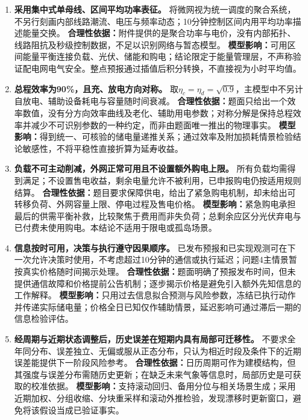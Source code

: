 \documentclass[withoutpreface,bwprint]{cumcmthesis}
\begin{document}
\begin{enumerate}[label=\textbf{假设\arabic*：},leftmargin=4.8em,itemsep=9pt,topsep=5pt]
\item \textbf{采用集中式单母线、区间平均功率表征。}
将微网视为统一调度的聚合系统，不另行刻画内部线路潮流、电压与频率动态；10分钟控制区间内用平均功率描述能量交换。
\textbf{合理性依据：}附件提供的是聚合功率与电价，没有内部拓扑、线路阻抗及秒级控制数据，不足以识别网络与暂态模型。
\textbf{模型影响：}可用区间能量平衡连接负载、光伏、储能和购电；结论限定于能量管理层，不声称验证配电网电气安全。整点预报通过插值后积分转换，不直接视为小时平均值。

\item \textbf{总程效率为90\%，且充、放电方向对称。}
取$\eta_c=\eta_d=\sqrt{0.9}$，主模型中不另计自放电、辅助设备耗电与容量随时间衰减。
\textbf{合理性依据：}题面只给出一个效率数值，没有分方向效率曲线及老化、辅助用电参数；对称分解是保持总程效率并减少不可识别参数的一种约定，而非由题面唯一推出的物理事实。
\textbf{模型影响：}得到统一、可核验的储电量递推关系；通过效率及附加损耗情景检验结论敏感性，不将平稳性直接折算为延寿收益。

\item \textbf{负载不可主动削减，外网正常可用且不设置额外购电上限。}
所有负载均需得到满足；不设置售电收益，剩余电量允许不被利用，已申报购电仍按适用规则结算。
\textbf{合理性依据：}题目要求保障供电，给出了紧急购电机制，却未给出可转移负荷、外网容量上限、停电过程及售电价格。
\textbf{模型影响：}紧急购电承担最后的供需平衡补救，比较聚焦于费用而非失负荷；总剩余应区分光伏弃电与已付费未使用购电。本结论不适用于限电或孤岛场景。

\item \textbf{信息按时可用，决策与执行遵守因果顺序。}
已发布预报和已实现观测可在下一次允许决策时使用，不考虑超过10分钟的通信或执行延迟；问题4主情景暂按真实价格随时间揭示处理。
\textbf{合理性依据：}题面明确了预报发布时间，但未提供通信故障和价格提前公告机制；逐步揭示价格是避免引入额外先知信息的工作解释。
\textbf{模型影响：}只用过去信息拟合预测与风险参数，冻结已执行动作并传递实际储电量；价格全日已知仅作辅助情景，延迟影响可通过滞后一期的信息检验评估。

\item \textbf{经周期与近期状态调整后，历史误差在短期内具有局部可迁移性。}
不要求全年同分布、误差独立、无偏或服从正态分布，只认为相近时段及条件下的近期误差能提供下一阶段风险参考。
\textbf{合理性依据：}日历周期可作为建模结构，但其强度与误差分布需随历史更新；在缺乏未来气象等信息时，局部历史是可获取的校准依据。
\textbf{模型影响：}支持滚动回归、备用分位与相关场景生成；采用近期加权、分组收缩、分块重采样和滚动外推检验，发现漂移时更新窗口，避免将该假设当成已验证事实。
\end{enumerate}
\end{document}
